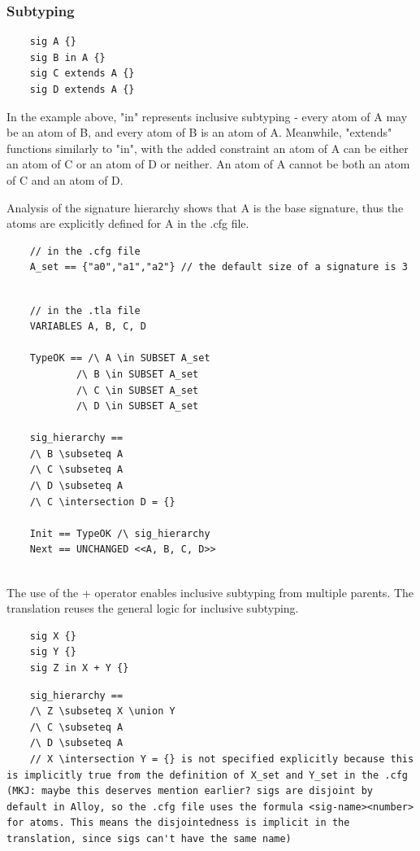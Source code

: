 \subsubsection{Subtyping}

\begin{verbatim}
	sig A {}
	sig B in A {}
	sig C extends A {}
	sig D extends A {}
\end{verbatim}

In the example above, "in" represents inclusive subtyping - every atom of A may be an atom of B, and every atom of B is an atom of A. Meanwhile, "extends" functions similarly to "in", with the added constraint an atom of A can be either an atom of C or an atom of D or neither. An atom of A cannot be both an atom of C and an atom of D.

Analysis of the signature hierarchy shows that A is the base signature, thus the atoms are explicitly defined for A in the .cfg file.



\begin{verbatim}
	// in the .cfg file
	A_set == {"a0","a1","a2"} // the default size of a signature is 3
	
\end{verbatim}

\begin{verbatim}
	// in the .tla file
	VARIABLES A, B, C, D

	TypeOK == /\ A \in SUBSET A_set
			/\ B \in SUBSET A_set
			/\ C \in SUBSET A_set
			/\ D \in SUBSET A_set

	sig_hierarchy ==
	/\ B \subseteq A
	/\ C \subseteq A
	/\ D \subseteq A
	/\ C \intersection D = {}

	Init == TypeOK /\ sig_hierarchy
	Next == UNCHANGED <<A, B, C, D>>
	
\end{verbatim}

The use of the + operator enables inclusive subtyping from multiple parents. The translation reuses the general logic for inclusive subtyping.

\begin{verbatim}
	sig X {}
	sig Y {}
	sig Z in X + Y {}
\end{verbatim}

\begin{verbatim}
	sig_hierarchy ==
	/\ Z \subseteq X \union Y
	/\ C \subseteq A
	/\ D \subseteq A
	// X \intersection Y = {} is not specified explicitly because this is implicitly true from the definition of X_set and Y_set in the .cfg (MKJ: maybe this deserves mention earlier? sigs are disjoint by default in Alloy, so the .cfg file uses the formula <sig-name><number> for atoms. This means the disjointedness is implicit in the translation, since sigs can't have the same name)
\end{verbatim}



